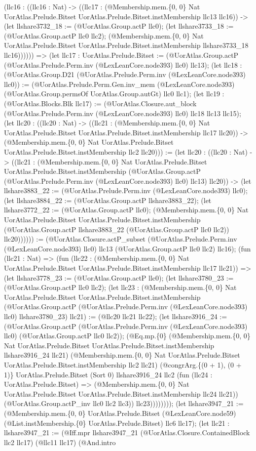 \documentclass[11pt]{article}
\begin{document}
(llc16 : ((llc16 : Nat) -> ((llc17 : (@Membership.mem.\{0, 0\} Nat UorAtlas.Prelude.Bitset UorAtlas.Prelude.Bitset.instMembership llc13 llc16)) -> (let llshare3732\_18 := (@UorAtlas.Group.actP llc0); (let llshare3733\_18 := (@UorAtlas.Group.actP llc0 llc2); (@Membership.mem.\{0, 0\} Nat UorAtlas.Prelude.Bitset UorAtlas.Prelude.Bitset.instMembership llshare3733\_18 llc16)))))) => (let llc17 : UorAtlas.Prelude.Bitset := (@UorAtlas.Group.actP (@UorAtlas.Prelude.Perm.inv (@LexLeanCore.node393) llc0) llc13); (let llc18 : (@UorAtlas.Group.D21 (@UorAtlas.Prelude.Perm.inv (@LexLeanCore.node393) llc0)) := (@UorAtlas.Prelude.Perm.Gen.inv\_mem (@LexLeanCore.node393) (@UorAtlas.Group.permsOf UorAtlas.Group.autGt) llc0 llc1); (let llc19 : (@UorAtlas.Blocks.Blk llc17) := (@UorAtlas.Closure.aut\_block (@UorAtlas.Prelude.Perm.inv (@LexLeanCore.node393) llc0) llc18 llc13 llc15); (let llc20 : ((llc20 : Nat) -> ((llc21 : (@Membership.mem.\{0, 0\} Nat UorAtlas.Prelude.Bitset UorAtlas.Prelude.Bitset.instMembership llc17 llc20)) -> (@Membership.mem.\{0, 0\} Nat UorAtlas.Prelude.Bitset UorAtlas.Prelude.Bitset.instMembership llc2 llc20))) := (let llc20 : ((llc20 : Nat) -> ((llc21 : (@Membership.mem.\{0, 0\} Nat UorAtlas.Prelude.Bitset UorAtlas.Prelude.Bitset.instMembership (@UorAtlas.Group.actP (@UorAtlas.Prelude.Perm.inv (@LexLeanCore.node393) llc0) llc13) llc20)) -> (let llshare3883\_22 := (@UorAtlas.Prelude.Perm.inv (@LexLeanCore.node393) llc0); (let llshare3884\_22 := (@UorAtlas.Group.actP llshare3883\_22); (let llshare3772\_22 := (@UorAtlas.Group.actP llc0); (@Membership.mem.\{0, 0\} Nat UorAtlas.Prelude.Bitset UorAtlas.Prelude.Bitset.instMembership (@UorAtlas.Group.actP llshare3883\_22 (@UorAtlas.Group.actP llc0 llc2)) llc20)))))) := (@UorAtlas.Closure.actP\_subset (@UorAtlas.Prelude.Perm.inv (@LexLeanCore.node393) llc0) llc13 (@UorAtlas.Group.actP llc0 llc2) llc16); (fun (llc21 : Nat) => (fun (llc22 : (@Membership.mem.\{0, 0\} Nat UorAtlas.Prelude.Bitset UorAtlas.Prelude.Bitset.instMembership llc17 llc21)) => (let llshare3778\_23 := (@UorAtlas.Group.actP llc0); (let llshare3780\_23 := (@UorAtlas.Group.actP llc0 llc2); (let llc23 : (@Membership.mem.\{0, 0\} Nat UorAtlas.Prelude.Bitset UorAtlas.Prelude.Bitset.instMembership (@UorAtlas.Group.actP (@UorAtlas.Prelude.Perm.inv (@LexLeanCore.node393) llc0) llshare3780\_23) llc21) := (@llc20 llc21 llc22); (let llshare3916\_24 := (@UorAtlas.Group.actP (@UorAtlas.Prelude.Perm.inv (@LexLeanCore.node393) llc0) (@UorAtlas.Group.actP llc0 llc2)); (@Eq.mp.\{0\} (@Membership.mem.\{0, 0\} Nat UorAtlas.Prelude.Bitset UorAtlas.Prelude.Bitset.instMembership llshare3916\_24 llc21) (@Membership.mem.\{0, 0\} Nat UorAtlas.Prelude.Bitset UorAtlas.Prelude.Bitset.instMembership llc2 llc21) (@congrArg.\{(0 + 1), (0 + 1)\} UorAtlas.Prelude.Bitset (Sort 0) llshare3916\_24 llc2 (fun (llc24 : UorAtlas.Prelude.Bitset) => (@Membership.mem.\{0, 0\} Nat UorAtlas.Prelude.Bitset UorAtlas.Prelude.Bitset.instMembership llc24 llc21)) (@UorAtlas.Group.actP\_inv llc0 llc2 llc3)) llc23)))))))); (let llshare3947\_21 := (@Membership.mem.\{0, 0\} UorAtlas.Prelude.Bitset (@LexLeanCore.node59) (@List.instMembership.\{0\} UorAtlas.Prelude.Bitset) llc6 llc17); (let llc21 : llshare3947\_21 := (@Iff.mpr llshare3947\_21 (@UorAtlas.Closure.ContainedBlock llc2 llc17) (@llc11 llc17) (@And.intro 
\end{document}
